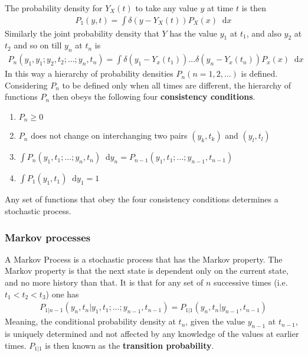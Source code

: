 \documentclass[twoside,english]{uiofysmaster}
\newcommand*\dif{\mathop{}\!\mathrm{d}}
\begin{document}
The probability density for $Y_X(t)$ to take any value $y$ at time $t$ is then
\begin{align}
	P_1 (y, t) = \int \delta (y- Y_X (t)) P_X (x) \dif x
\end{align}
Similarly the joint probability density that $Y$ has the value $y_1$ at $t_1$, and also $y_2$ at $t_2$ and so on till $y_n$ at $t_n$ is
\begin{align}
	P_n (y_1, y_1; y_2, t_2; ...; y_n, t_n)
	= \int \delta (y_1 - Y_x (t_1)) ... \delta (y_n - Y_x (t_n)) P_x (x) \dif x
\end{align}
In this way a hierarchy of probability densities $P_n (n=1,2,...)$ is defined.
Considering $P_n$ to be defined only when all times are different, the hierarchy of functions $P_n$ then obeys the following four \textbf{consistency conditions}.
\begin{enumerate}
	\item $P_n \geq 0$
	\item $P_n$ does not change on interchanging two pairs $(y_k, t_k)$ and $(y_l, t_l)$
	\item $\int P_n (y_1, t_1; ...; y_n, t_n) \dif y_n = P_{n-1} (y_1, t_1; ...; y_{n-1}, t_{n-1}) $
	\item $\int P_1 (y_1, t_1) \dif y_1 = 1$ 
\end{enumerate}
Any set of functions that obey the four consistency conditions determines a stochastic process.
\cite{VanKampen2007}


\subsubsection{Markov processes}
A Markov Process is a stochastic process that has the Markov property. The Markov property is that the next state is dependent only on the current state, and no more history than that. It is that for any set of $n$ successive times (i.e. $t_1<t_2<t_3$) one has
\begin{align}
	P_{1|n-1} (y_n, t_n | y_1, t_1; ...; y_{n-1}, t_{n-1}) = P_{1|1} (y_n, t_n | y_{n-1}, t_{n-1})
\end{align}
Meaning, the conditional probability density at $t_n$, given the value $y_{n-1}$ at $t_{n-1}$, is uniquely determined and not affected by any knowledge of the values at earlier times. $P_{1|1}$ is then known as the \textbf{transition probability}.
\end{document}
